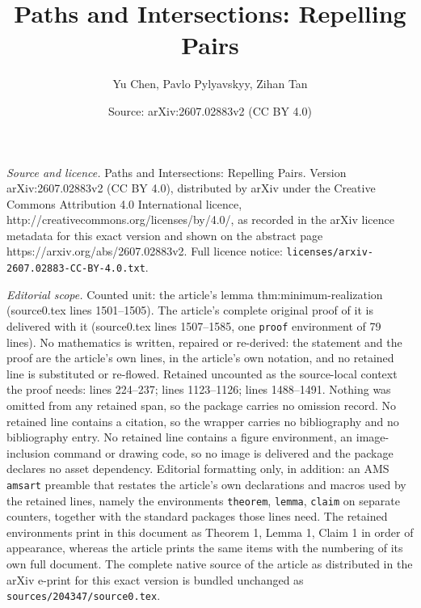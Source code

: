 \documentclass[10pt,a4paper]{amsart}
\title{Paths and Intersections: Repelling Pairs}
\author{Yu Chen, Pavlo Pylyavskyy, Zihan Tan}
\date{Source: arXiv:2607.02883v2 (CC BY 4.0)}
\begin{document}
\maketitle

\noindent\emph{Source and licence.} Paths and Intersections: Repelling Pairs. Version arXiv:2607.02883v2 (CC BY 4.0), distributed by arXiv under the Creative Commons Attribution 4.0 International licence, http://creativecommons.org/licenses/by/4.0/, as recorded in the arXiv licence metadata for this exact version and shown on the abstract page https://arxiv.org/abs/2607.02883v2. Full licence notice: \texttt{licenses/arxiv-2607.02883-CC-BY-4.0.txt}.\par\smallskip

\noindent\textit{Editorial scope.} Counted unit: the article's lemma thm:minimum-realization (source0.tex lines 1501--1505). The article's complete original proof of it is delivered with it (source0.tex lines 1507--1585, one \texttt{proof} environment of 79 lines). No mathematics is written, repaired or re-derived: the statement and the proof are the article's own lines, in the article's own notation, and no retained line is substituted or re-flowed.  Retained uncounted as the source-local context the proof needs: lines 224--237; lines 1123--1126; lines 1488--1491.  Nothing was omitted from any retained span, so the package carries no omission record.  No retained line contains a citation, so the wrapper carries no bibliography and no bibliography entry.  No retained line contains a figure environment, an image-inclusion command or drawing code, so no image is delivered and the package declares no asset dependency.  Editorial formatting only, in addition: an AMS \texttt{amsart} preamble that restates the article's own declarations and macros used by the retained lines, namely the environments \texttt{theorem}, \texttt{lemma}, \texttt{claim} on separate counters, together with the standard packages those lines need.  The retained environments print in this document as Theorem 1, Lemma 1, Claim 1 in order of appearance, whereas the article prints the same items with the numbering of its own full document.  The complete native source of the article as distributed in the arXiv e-print for this exact version is bundled unchanged as \texttt{sources/204347/source0.tex}.
\end{document}
